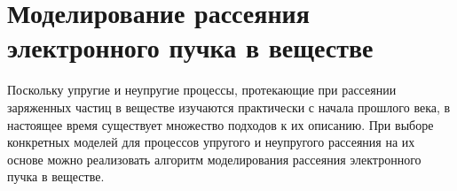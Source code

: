\section{Моделирование рассеяния электронного пучка в веществе}

Поскольку упругие и неупругие процессы, протекающие при рассеянии заряженных частиц в веществе изучаются практически с начала прошлого века, в настоящее время существует множество подходов к их описанию. При выборе конкретных моделей для процессов упругого и неупругого рассеяния на их основе можно реализовать алгоритм моделирования рассеяния электронного пучка в веществе.





